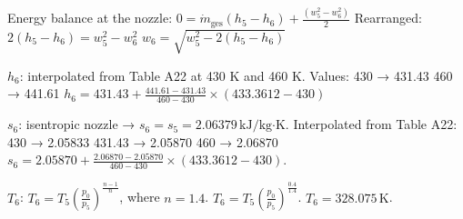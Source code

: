Energy balance at the nozzle:  
\( 0 = \dot{m}_{\text{ges}} (h_5 - h_6) + \frac{(w_5^2 - w_6^2)}{2} \)  
Rearranged:  
\( 2 (h_5 - h_6) = w_5^2 - w_6^2 \)  
\( w_6 = \sqrt{w_5^2 - 2 (h_5 - h_6)} \)  

\( h_6 \): interpolated from Table A22 at 430 K and 460 K.  
Values:  
430 → 431.43  
460 → 441.61  
\( h_6 = 431.43 + \frac{441.61 - 431.43}{460 - 430} \times (433.3612 - 430) \)  

\( s_6 \): isentropic nozzle → \( s_6 = s_5 = 2.06379 \, \text{kJ/kg·K} \).  
Interpolated from Table A22:  
430 → 2.05833  
431.43 → 2.05870  
460 → 2.06870  
\( s_6 = 2.05870 + \frac{2.06870 - 2.05870}{460 - 430} \times (433.3612 - 430) \).  

\( T_6 \):  
\( T_6 = T_5 \left( \frac{p_0}{p_5} \right)^{\frac{n-1}{n}} \), where \( n = 1.4 \).  
\( T_6 = T_5 \left( \frac{p_0}{p_5} \right)^{\frac{0.4}{1.4}} \).  
\( T_6 = 328.075 \, \text{K} \).